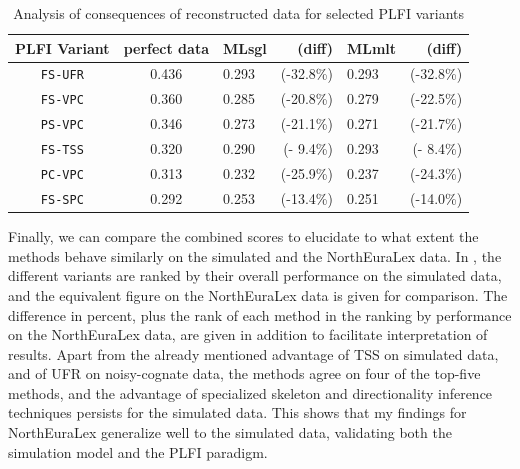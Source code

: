 \begin{table}
 \centering
 \begin{tabular}{cclrlr}
 \hline \hline
PLFI Variant & perfect data & MLsgl & (diff) & MLmlt & (diff)\\ \hline
\texttt{FS-UFR} & 0.436 & 0.293 & (-32.8\%) & 0.293 & (-32.8\%)\\
\texttt{FS-VPC} & 0.360 & 0.285 & (-20.8\%) & 0.279 & (-22.5\%)\\
\texttt{PS-VPC} & 0.346 & 0.273 & (-21.1\%) & 0.271 & (-21.7\%)\\
\texttt{FS-TSS} & 0.320 & 0.290 & (- 9.4\%) & 0.293 & (- 8.4\%)\\
\texttt{PC-VPC} & 0.313 & 0.232 & (-25.9\%) & 0.237 & (-24.3\%)\\
\texttt{FS-SPC} & 0.292 & 0.253 & (-13.4\%) & 0.251 & (-14.0\%)\\
  \hline
 \end{tabular}
 \caption{Analysis of consequences of reconstructed data for selected PLFI variants}
 \label{variant-comparison-perfect-vs-reconstructed}
\end{table}

Finally, we can compare the combined scores to elucidate to what extent the methods behave similarly on the simulated and the NorthEuraLex data. In , the different variants are ranked by their overall performance on the simulated data, and the equivalent figure on the NorthEuraLex data is given for comparison. The difference in percent, plus the rank of each method in the ranking by performance on the NorthEuraLex data, are given in addition to facilitate interpretation of results. Apart from the already mentioned advantage of TSS on simulated data, and of UFR on noisy-cognate data, the methods agree on four of the top-five methods, and the advantage of specialized skeleton and directionality inference techniques persists for the simulated data. This shows that my findings for NorthEuraLex generalize well to the simulated data, validating both the simulation model and the PLFI paradigm.

